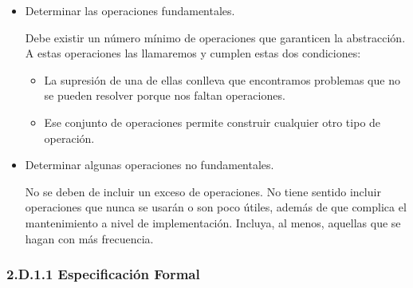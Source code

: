 \begin{itemize}
\item Determinar las operaciones fundamentales.

Debe existir un número mínimo de operaciones que garanticen la abstracción. 
A estas operaciones las llamaremos  y cumplen estas dos condiciones:
\begin{itemize}
\item La supresión de una de ellas conlleva que encontramos problemas que no se pueden resolver porque nos faltan operaciones.
\item Ese conjunto de operaciones permite construir cualquier otro tipo de operación.
\end{itemize}


\item Determinar algunas operaciones no fundamentales.

No se deben de incluir un exceso de operaciones. 
No tiene sentido incluir operaciones que nunca se usarán o son poco útiles, además de que complica el mantenimiento a nivel de implementación. Incluya, al menos, aquellas que se hagan con más frecuencia.
\end{itemize}


\subsubsection*{2.D.1.1 Especificación Formal}



